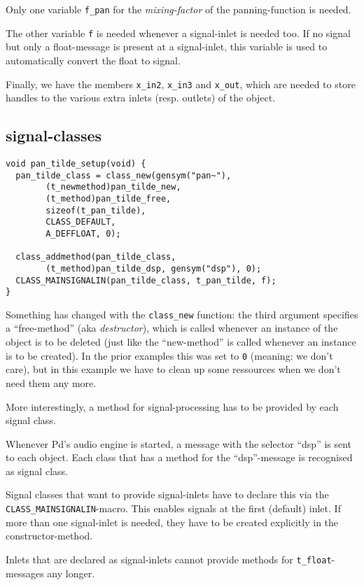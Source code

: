 \documentclass[12pt, a4paper,english,titlepage]{article}
\begin{document}
Only one variable \verb+f_pan+ for the {\em mixing-factor} of the panning-function is needed.

The other variable \verb+f+ is needed whenever a signal-inlet is needed too.
If no signal but only a float-message is present at a signal-inlet, this
variable is used to automatically convert the float to signal.

Finally, we have the members \verb+x_in2+, \verb+x_in3+ and \verb+x_out+,
which are needed to store handles to the various extra inlets (resp. outlets) of the object.

\subsection{signal-classes}

\begin{verbatim}
void pan_tilde_setup(void) {
  pan_tilde_class = class_new(gensym("pan~"),
        (t_newmethod)pan_tilde_new,
        (t_method)pan_tilde_free,
        sizeof(t_pan_tilde),
        CLASS_DEFAULT, 
        A_DEFFLOAT, 0);

  class_addmethod(pan_tilde_class,
        (t_method)pan_tilde_dsp, gensym("dsp"), 0);
  CLASS_MAINSIGNALIN(pan_tilde_class, t_pan_tilde, f);
}
\end{verbatim}

Something has changed with the \verb+class_new+ function: 
the third argument specifies a ``free-method'' (aka {\em destructor}), which is called whenever an instance of the object
is to be deleted (just like the ``new-method'' is called whenever an instance is to be created).
In the prior examples this was set to \verb+0+ (meaning: we don't care),
but in this example we have to clean up some ressources when we don't need them any more.

More interestingly, a method for signal-processing has to be provided by each signal class.

Whenever Pd's audio engine is started, a message with the selector ``dsp''
is sent to each object.
Each class that has a method for the ``dsp''-message is recognised as signal class.

Signal classes that want to provide signal-inlets have to
declare this via the \verb+CLASS_MAINSIGNALIN+-macro.
This enables signals at the first (default) inlet.
If more than one signal-inlet is needed, they have to be created explicitly
in the constructor-method.

Inlets that are declared as signal-inlets cannot provide
methods for \verb+t_float+-messages any longer.
\end{document}
